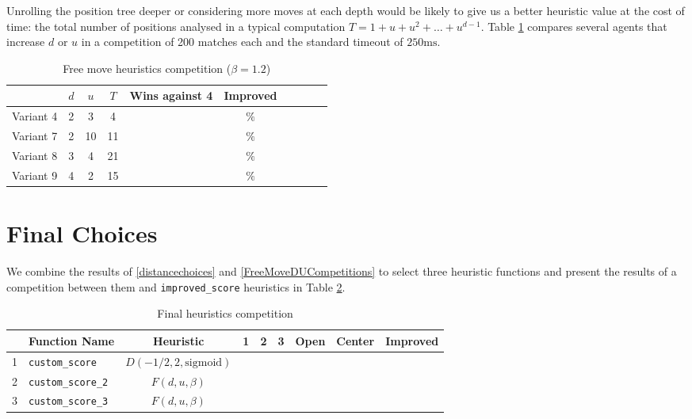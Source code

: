 \documentclass[oneside]{article}   	%
\begin{document}
Unrolling the position tree deeper or considering more moves at each depth would be likely to give us a better heuristic value at the cost of time: the total number of positions analysed in a typical computation $T = 1+u+u^2+\dots+u^{d-1}$. Table \ref{FreeMoveDUCompetition} compares several agents that increase $d$ or $u$ in a competition of 200 matches each and the standard timeout of $250\textrm{ms}$.

\begin{table}[htp]
\caption{Free move heuristics competition ($\beta = 1.2$)}
\begin{center}
\begin{tabular}{c|cc|c|rccccc}
   & $d$ & $u$ & $T$  & Wins against 4 & Improved \\
   \hline
 Variant 4 &    2 & 3   & 4   & & $\%$ \\
 Variant 7 &    2 & 10  & 11 & & $\%$ \\
 Variant 8 &    3 & 4   & 21  & & $\%$ \\
 Variant 9 &    4 & 2   & 15  & & $\%$ \\
\end{tabular}
\end{center}
\label{FreeMoveDUCompetition}
\end{table}%

\section{Final Choices}


We combine the results of \ref{distancechoices} and \ref{FreeMoveDUCompetitions} to select three heuristic functions and present the results of a competition between them and \texttt{improved\_score} heuristics in Table \ref{FinalCompetition}.

\begin{table}[htp]
\caption{Final heuristics competition}
\begin{center}
\begin{tabular}{c|lc|cccccc}
   & Function Name & Heuristic & 1 & 2 & 3 & Open & Center & Improved \\
   \hline
1 & \texttt{custom\_score}    & $D(-1/2, 2, \textrm{sigmoid})$ & & & & & &  \\
2 & \texttt{custom\_score\_2} & $F(d, u, \beta)$               & & & & & &  \\
3 & \texttt{custom\_score\_3} & $F(d, u, \beta)$               & & & & & &  
\end{tabular}
\end{center}
\label{FinalCompetition}
\end{table}%
\end{document}
